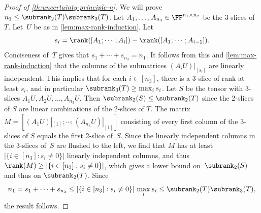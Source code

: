 \begin{proof}[Proof of \autoref{th:uncertainty-principle-n}]
We will prove $n_1 \leq \subrank_2(T) \subrank_3(T)$.
Let $A_1, \ldots, A_{n_3} \in \FF^{n_1 \times n_2}$ be the $3$-slices of $T$.
Let~$U$ be as in \autoref{lem:max-rank-induction}.
Let 
\[
s_i = \rank([A_1; \cdots ; A_{i}]) - \rank([A_1; \cdots ; A_{i-1}]).
\]
Conciseness of~$T$ gives that $s_1 + \cdots + s_{n_3} = n_1$.
It follows from this and \autoref{lem:max-rank-induction} that the columns of the submatrices $(A_iU)|_{[s_i]}$ are linearly independent.
This implies that for each $i\in[n_3]$, 
there is a 3-slice of rank at least $s_i$,
%
and in particular $\subrank_3(T)\geq\max_i s_i$. %
%
Let $S$ be the tensor with 3-slices $A_1U, A_2U, \ldots, A_{n_3}U$. Then $\subrank_2(S) \leq \subrank_2(T)$ since the 2-slices of $S$ are linear combinations of the 2-slices of $T$. 
The matrix $M = [(A_1U)|_{[1]};\cdots ; (A_{n_3}U)|_{[1]}]$ consisting of every first column of the 3-slices of $S$ equals the first 2-slice of~$S$. Since the linearly independent columns in the 3-slices of~$S$ are flushed to the left, we find that $M$ has at least $|\{i\in [n_3]: s_i\ne 0\}|$ linearly independent columns, and thus $\rank(M) \geq |\{i\in [n_3]: s_i\ne 0\}|$,
%
%
which gives a lower bound on~$\subrank_2(S)$ and thus on $\subrank_2(T)$.
Since
\[
n_1  = s_1 + \cdots + s_{n_3}\leq |\{i\in [n_3]: s_i\ne 0\}|\, \max_i s_i \leq \subrank_2(T) \subrank_3(T),
\]
the result follows. %
%
%
%
%
%
%
%
%
%
%
%
\end{proof}
